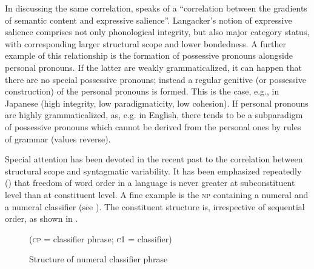 In discussing the same correlation, \citet[112f]{Langacker1977} speaks of a “correlation between the gradients of semantic content and expressive salience”. Langacker's notion of expressive salience comprises not only phonological integrity, but also major category status, with corresponding larger structural scope and lower bondedness. A further example of this relationship is the formation of possessive pronouns alongside personal pronouns. If the latter are weakly grammaticalized, it can happen that there are no special possessive pronouns; instead a regular genitive (or possessive construction) of the personal pronouns is formed. This is the case, e.g., in Japanese (high integrity, low paradigmaticity, low cohesion). If personal pronouns are highly grammaticalized, as, e.g. in English, there tends to be a subparadigm of possessive pronouns which cannot be derived from the personal ones by rules of grammar (values reverse).

Special attention has been devoted in the recent past to the correlation between structural scope and syntagmatic variability. It has been emphasized repeatedly (\citealt[205--209]{Givón1979a}) that freedom of word order in a language is never greater at subconstituent level than at constituent level. A fine example is the \textsc{np} containing a numeral and a numeral classifier (see \citealt[29]{Greenberg1975}). The constituent structure is, irrespective of sequential order, as shown in .

\begin{figure}
	
	(\textsc{cp} = classifier phrase; \textsc{c1} = classifier)
	\caption{Structure of numeral classifier phrase} \label{F11}
\end{figure}

